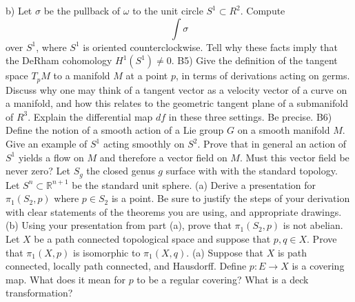 \documentclass[10pt]{article}
\begin{document}
b) Let $\sigma$ be the pullback of $\omega$ to the unit circle $S^{1} \subset R^{2}$. Compute
$$
\int \sigma
$$
over $S^{1}$, where $S^{1}$ is oriented counterclockwise. Tell why these facts imply that the DeRham cohomology $H^{1}\left(S^{1}\right) \neq 0$.
\newpage
B5) Give the definition of the tangent space $T_{p} M$ to a manifold $M$ at a point $p$, in terms of derivations acting on germs. Discuss why one may think of a tangent vector as a velocity vector of a curve on a manifold, and how this relates to the geometric tangent plane of a submanifold of $R^{3}$. Explain the differential map $d f$ in these three settings. Be precise.
\newpage
B6) Define the notion of a smooth action of a Lie group $G$ on a smooth manifold $M$. Give an example of $S^{1}$ acting smoothly on $S^{2}$. Prove that in general an action of $S^{1}$ yields a flow on $M$ and therefore a vector field on $M$. Must this vector field be never zero?
\newpage
Let $S_{g}$ the closed genus $g$ surface with with the standard topology. Let $S^{n} \subset \mathbb{R}^{n+1}$ be the standard unit sphere.
(a) Derive a presentation for $\pi_{1}\left(S_{2}, p\right)$ where $p \in S_{2}$ is a point. Be sure to justify the steps of your derivation with clear statements of the theorems you are using, and appropriate drawings.
(b) Using your presentation from part (a), prove that $\pi_{1}\left(S_{2}, p\right)$ is not abelian.
\newpage
Let $X$ be a path connected topological space and suppose that $p, q \in X$. Prove that $\pi_{1}(X, p)$ is isomorphic to $\pi_{1}(X, q)$.
(a) Suppose that $X$ is path connected, locally path connected, and Hausdorff. Define $p: E \rightarrow X$ is a covering map. What does it mean for $p$ to be a regular covering? What is a deck transformation?
\end{document}
